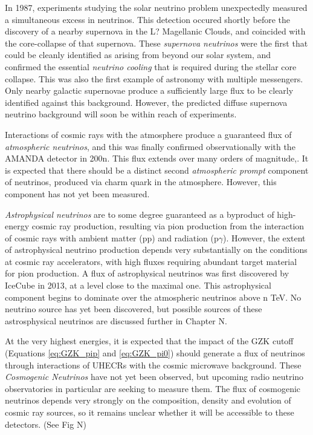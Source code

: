 In 1987, experiments studying the solar neutrino problem unexpectedly measured a simultaneous excess in neutrinos. This detection occured shortly before the discovery of a nearby supernova in the L? Magellanic Clouds, and coincided with the core-collapse of that supernova. These \emph{supernova neutrinos} were the first that could be cleanly identified as arising from beyond our solar system, and confirmed the essential \emph{neutrino cooling} that is required during the stellar core collapse. This was also the first example of astronomy with multiple messengers. Only nearby galactic supernovae produce a sufficiently large flux to be clearly identified against this background. However, the predicted diffuse supernova neutrino background will soon be within reach of experiments.

Interactions of cosmic rays with the atmosphere produce a guaranteed flux of \emph{atmospheric neutrinos}, and this was finally confirmed observationally with the AMANDA detector in 200n. This flux extends over many orders of magnitude,. It is expected that there should be a distinct second \emph{atmospheric prompt} component of neutrinos, produced via charm quark in the atmosphere. However, this component has not yet been measured.

\emph{Astrophysical neutrinos} are to some degree guaranteed as a byproduct of high-energy cosmic ray production, resulting via pion production from the interaction of cosmic rays with ambient matter (pp) and radiation (p$\gamma$). However, the extent of astrophysical neutrino production depends very substantially on the conditions at cosmic ray accelerators, with high fluxes requiring abundant target material for pion production. A flux of astrophysical neutrinos was first discovered by IceCube in 2013, at a level close to the maximal one. This astrophysical component begins to dominate over the atmospheric neutrinos above n TeV. No neutrino source has yet been discovered, but possible sources of these astrosphysical neutrinos are discussed further in Chapter N.

At the very highest energies, it is expected that the impact of the GZK cutoff (Equations \ref{eq:GZK_pip} and \ref{eq:GZK_pi0}) should generate a flux of neutrinos through interactions of UHECRs with the cosmic microwave background. These \emph{Cosmogenic Neutrinos} have not yet been observed, but upcoming radio neutrino observatories in particular are seeking to measure them. The flux of cosmogenic neutrinos depends very strongly on the composition, density and evolution of cosmic ray sources, so it remains unclear whether it will be accessible to these detectors. (See Fig N)

